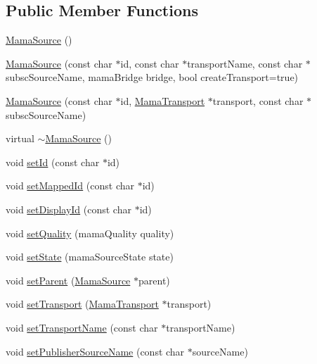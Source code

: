 \subsection*{Public Member Functions}
\begin{DoxyCompactItemize}
\item 
\hyperlink{classWombat_1_1MamaSource_aae219bdf6047a5cd0d39edf1e769e7c1}{MamaSource} ()
\item 
\hyperlink{classWombat_1_1MamaSource_ac2638dec484d3153ef9d5f658f0ac81e}{MamaSource} (const char $\ast$id, const char $\ast$transportName, const char $\ast$subscSourceName, mamaBridge bridge, bool createTransport=true)
\item 
\hyperlink{classWombat_1_1MamaSource_ab93cd1b640228bfe6eedf745a85b7d07}{MamaSource} (const char $\ast$id, \hyperlink{classWombat_1_1MamaTransport}{MamaTransport} $\ast$transport, const char $\ast$subscSourceName)
\item 
virtual \hyperlink{classWombat_1_1MamaSource_a6697a678c9375af09bd49af4d506cc7a}{$\sim$MamaSource} ()
\item 
void \hyperlink{classWombat_1_1MamaSource_aef52459f15922b8624097071801b7195}{setId} (const char $\ast$id)
\item 
void \hyperlink{classWombat_1_1MamaSource_a24281e142f2e8a84efb1727f17f094bb}{setMappedId} (const char $\ast$id)
\item 
void \hyperlink{classWombat_1_1MamaSource_a723e221b72e418d13bbef84b101b4faa}{setDisplayId} (const char $\ast$id)
\item 
void \hyperlink{classWombat_1_1MamaSource_afe18fd5c7376c482d212505c9258b8dd}{setQuality} (mamaQuality quality)
\item 
void \hyperlink{classWombat_1_1MamaSource_ac51271403c954b64180618a6b255e476}{setState} (mamaSourceState state)
\item 
void \hyperlink{classWombat_1_1MamaSource_ae2b404a18bf30bef37a6d339645fdfb8}{setParent} (\hyperlink{classWombat_1_1MamaSource}{MamaSource} $\ast$parent)
\item 
void \hyperlink{classWombat_1_1MamaSource_aad1d0c72704a9f91e1ee83240408cc98}{setTransport} (\hyperlink{classWombat_1_1MamaTransport}{MamaTransport} $\ast$transport)
\item 
void \hyperlink{classWombat_1_1MamaSource_a175f7b0c40ed81f0a69ad5c3f9ced34a}{setTransportName} (const char $\ast$transportName)
\item 
void \hyperlink{classWombat_1_1MamaSource_abc87a3603100603a48d73ddd44f7b120}{setPublisherSourceName} (const char $\ast$sourceName)

\end{DoxyCompactItemize}
